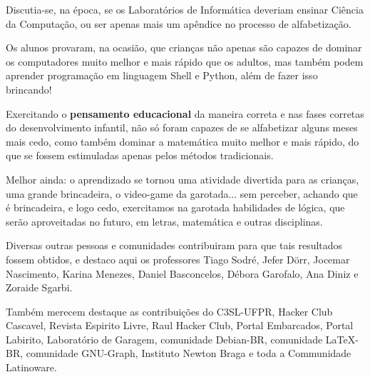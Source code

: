 \begin{multicols}{2}
{Discutia-se, na época, se os Laboratórios de Informática deveriam ensinar Ciência da Computação, ou ser apenas mais um apêndice no processo de alfabetização.

Os alunos provaram, na ocasião, que crianças não apenas são capazes de dominar os computadores muito melhor e mais rápido que os adultos, mas também podem aprender programação em linguagem Shell e Python, além de fazer isso brincando!

Exercitando o \textbf{pensamento educacional} da maneira correta e nas fases corretas do desenvolvimento infantil, não só foram capazes de se alfabetizar alguns meses mais cedo, como também dominar a matemática muito melhor e mais rápido, do que se fossem estimuladas apenas pelos métodos tradicionais.

Melhor ainda: o aprendizado se tornou uma atividade divertida para as crianças, uma grande brincadeira, o video-game da garotada... sem perceber, achando que é brincadeira, e logo cedo, exercitamos na garotada habilidades de lógica, que serão aproveitadas no futuro, em letras, matemática e outras disciplinas.

Diversas outras pessoas e comunidades contribuiram para que tais resultados fossem obtidos, e destaco aqui os professores Tiago Sodré, Jefer Dörr, Jocemar Nascimento, Karina Menezes, Daniel Basconcelos, Débora Garofalo, Ana Diniz e Zoraide Sgarbi.

Também merecem destaque as contribuições do C3SL-UFPR, Hacker Club Cascavel, Revista Espirito Livre, Raul Hacker Club, Portal Embarcados, Portal Labirito, Laboratório de Garagem, comunidade Debian-BR, comunidade \LaTeX-BR, comunidade GNU-Graph, Instituto Newton Braga e toda a Communidade Latinoware.}
\end{multicols}

\vfill
\pagebreak